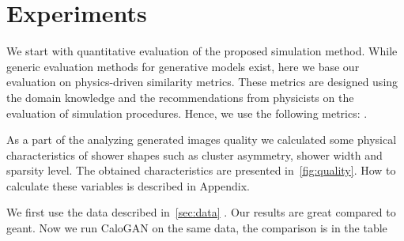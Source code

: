 \section{Experiments}

We start with quantitative evaluation of the proposed simulation method. While generic evaluation methods for generative models exist, here we base our evaluation on physics-driven similarity metrics. These metrics are designed using the domain knowledge and the recommendations from physicists on the evaluation of simulation procedures. Hence, we use the following metrics: . 


As a part of the analyzing generated images quality we calculated some physical characteristics of shower shapes such as cluster asymmetry, shower width and sparsity level. The obtained characteristics are presented in~\cref{fig:quality}. How to calculate these variables is described in Appendix.


We first use the data described in~\ref{sec:data} . Our results are great compared to geant. Now we run CaloGAN on the same data, the comparison is in the table   

